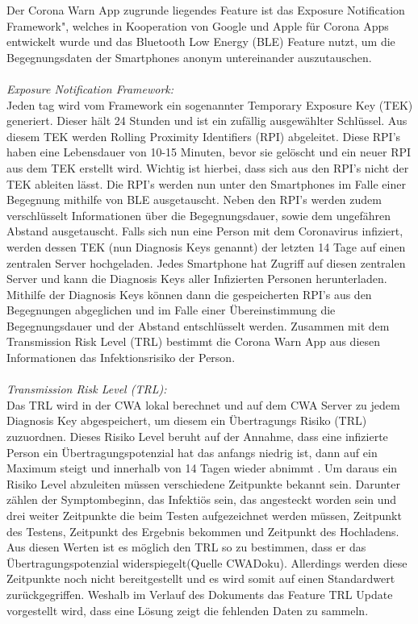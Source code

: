 \documentclass[conference]{IEEEtran}
\begin{document}
Der Corona Warn App zugrunde liegendes Feature ist das \glqq Exposure Notification Framework", 
welches in Kooperation von Google und Apple für Corona Apps entwickelt wurde und das Bluetooth Low Energy (BLE) Feature nutzt, 
um die Begegnungsdaten der Smartphones anonym untereinander auszutauschen. \\
\\
\textit{Exposure Notification Framework:}\\
Jeden tag wird vom Framework ein sogenannter Temporary Exposure Key (TEK) generiert. Dieser hält 24 Stunden und ist ein zufällig ausgewählter Schlüssel. 
Aus diesem TEK werden Rolling Proximity Identifiers (RPI) abgeleitet. 
Diese RPI's haben eine Lebensdauer von 10-15 Minuten, bevor sie gelöscht und ein neuer RPI aus dem TEK erstellt wird. Wichtig ist hierbei, 
dass sich aus den RPI's nicht der TEK ableiten lässt. 
Die RPI's werden nun unter den Smartphones im Falle einer Begegnung mithilfe von BLE ausgetauscht. Neben den RPI's werden zudem verschlüsselt Informationen über die Begegnungsdauer, sowie dem ungefähren Abstand ausgetauscht.
Falls sich nun eine Person mit dem Coronavirus infiziert, werden dessen TEK (nun Diagnosis Keys genannt) der letzten 14 Tage auf einen zentralen Server hochgeladen. 
Jedes Smartphone hat Zugriff auf diesen zentralen Server und kann die Diagnosis Keys aller Infizierten Personen  herunterladen. 
Mithilfe der Diagnosis Keys können dann die gespeicherten RPI's aus den Begegnungen abgeglichen und im Falle einer Übereinstimmung die Begegnungsdauer und der Abstand entschlüsselt werden. 
Zusammen mit dem Transmission Risk Level (TRL) bestimmt die Corona Warn App aus diesen Informationen das Infektionsrisiko der Person. \\
\\
\textit{Transmission Risk Level (TRL):}\\
Das TRL wird in der CWA lokal berechnet und auf dem CWA Server zu jedem Diagnosis Key abgespeichert, um diesem ein Übertragungs Risiko (TRL) zuzuordnen. 
Dieses Risiko Level beruht auf der Annahme, dass eine infizierte Person ein Übertragungspotenzial hat das anfangs niedrig ist, 
dann auf ein Maximum steigt und innerhalb von 14 Tagen wieder abnimmt . Um daraus ein Risiko Level abzuleiten müssen verschiedene Zeitpunkte bekannt sein. 
Darunter zählen der Symptombeginn, das Infektiös sein, das angesteckt worden sein und drei weiter Zeitpunkte die beim Testen aufgezeichnet werden müssen, 
Zeitpunkt des Testens, Zeitpunkt des Ergebnis bekommen und Zeitpunkt des Hochladens. Aus diesen Werten ist es möglich den TRL so zu bestimmen, 
dass er das Übertragungspotenzial widerspiegelt(Quelle CWADoku).
Allerdings werden diese Zeitpunkte noch nicht bereitgestellt und es wird somit auf einen Standardwert zurückgegriffen. 
Weshalb im Verlauf des Dokuments das Feature TRL Update vorgestellt wird, dass eine Lösung zeigt die fehlenden Daten zu sammeln.
\end{document}
